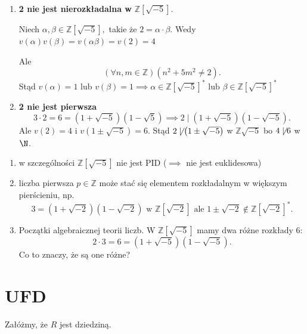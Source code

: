 \begin{enumerate}[label=\arabic*)]
	\item \textbf{2 nie jest nierozkładalna w } $\mathbb{Z} \left[ \sqrt{-5}  \right] $.

		Niech $\alpha , \beta \in \mathbb{Z} \left[ \sqrt{-5}  \right],$ takie że $2 = \alpha \cdot \beta $.
		Wedy
		$v\left( \alpha  \right) v\left( \beta  \right) = v\left( \alpha \beta  \right) = v\left( 2 \right) = 4$ 

		Ale 
		\[
		\left(\forall n,m \in \mathbb{Z}  \right)\left( n^2 + 5m^2 \neq 2 \right)  
		.\] 
		Stąd $v\left( \alpha  \right) = 1$ lub $v\left( \beta  \right) = 1 \implies \alpha \in \mathbb{Z} \left[ \sqrt{-5}  \right]^{\ast} \text{ lub } \beta \in \mathbb{Z} \left[ \sqrt{-5}  \right] ^{\ast} $
	\item \textbf{2 nie jest pierwsza} 
		\[
		3\cdot 2 = 6 = \left( 1 + \sqrt{-5}  \right)\left( 1-\sqrt{5}  \right) \implies 2 \mid \left( 1 + \sqrt{-5}  \right) \left( 1-\sqrt{-5}  \right) 
		.\] 
		Ale $v\left( 2 \right)  = 4 $ i $v\left( 1\pm \sqrt{-5}  \right) = 6$. Stąd $2 \not\mid \left( 1\pm \sqrt{-5}  \right) $ w $\mathbb{Z} \sqrt{-5} $ bo $4 \not\mid 6$ w $\N$.
\end{enumerate}
\begin{remark}
	\begin{enumerate}[label=\arabic*)]
		\item w szczególności $\mathbb{Z} \left[ \sqrt{-5}  \right] $ nie jest PID ($\implies$ nie jest euklidesowa)
		\item liczba pierwsza $p \in \mathbb{Z} $ może stać się elementem rozkładalnym w większym pierścieniu, np. 
			\[
			3 = \left( 1+\sqrt{-2}  \right) \left( 1 - \sqrt{-2}  \right) \text{ w } \mathbb{Z} \left[ \sqrt{-2}  \right] \text{ ale } 1\pm \sqrt{-2} \not\in \mathbb{Z} \left[ \sqrt{-2}  \right] ^{\ast} 
			.\] 
		\item Początki algebraicznej teorii liczb. W $\mathbb{Z} \left[ \sqrt{-5}  \right] $ mamy dwa różne rozkłady 6:
			\[
			2\cdot 3 = 6 = \left( 1+ \sqrt{-5}  \right) \left( 1-\sqrt{-5}  \right) 
			.\] 
			Co to znaczy, że są one różne?
	\end{enumerate}
\end{remark} 
\section{UFD}
Załóżmy, że $R$ jest dziedziną.

